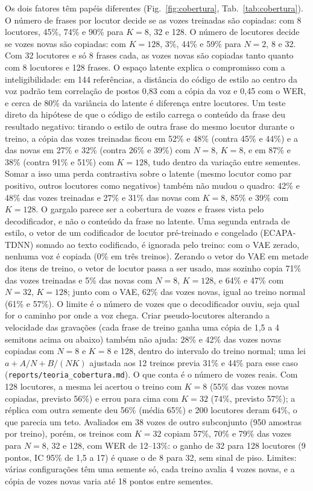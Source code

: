 \documentclass[twocolumn,a4paper,10pt]{article}
\begin{document}
Os dois fatores têm papéis diferentes (Fig.~\ref{fig:cobertura}, Tab.~\ref{tab:cobertura}). O número de frases por locutor decide se as vozes treinadas são copiadas: com 8 locutores, 45\%, 74\% e 90\% para $K=8$, 32 e 128. O número de locutores decide se vozes novas são copiadas: com $K=128$, 3\%, 44\% e 59\% para $N=2$, 8 e 32. Com 32 locutores e só 8 frases cada, as vozes novas são copiadas tanto quanto com 8 locutores e 128 frases. O espaço latente explica o compromisso com a inteligibilidade: em 144 referências, a distância do código de estilo ao centro da voz padrão tem correlação de postos 0,83 com a cópia da voz e 0,45 com o WER, e cerca de 80\% da variância do latente é diferença entre locutores. Um teste direto da hipótese de que o código de estilo carrega o conteúdo da frase deu resultado negativo: tirando o estilo de outra frase do mesmo locutor durante o treino, a cópia das vozes treinadas ficou em 52\% e 48\% (contra 45\% e 44\%) e a das novas em 27\% e 32\% (contra 26\% e 39\%) com $N=8$, $K=8$, e em 87\% e 38\% (contra 91\% e 51\%) com $K=128$, tudo dentro da variação entre sementes. Somar a isso uma perda contrastiva sobre o latente (mesmo locutor como par positivo, outros locutores como negativos) também não mudou o quadro: 42\% e 48\% das vozes treinadas e 27\% e 31\% das novas com $K=8$, 85\% e 39\% com $K=128$. O gargalo parece ser a cobertura de vozes e frases vista pelo decodificador, e não o conteúdo da frase no latente. Uma segunda entrada de estilo, o vetor de um codificador de locutor pré-treinado e congelado (ECAPA-TDNN) somado ao texto codificado, é ignorada pelo treino: com o VAE zerado, nenhuma voz é copiada (0\% em três treinos). Zerando o vetor do VAE em metade dos itens de treino, o vetor de locutor passa a ser usado, mas sozinho copia 71\% das vozes treinadas e 5\% das novas com $N=8$, $K=128$, e 64\% e 47\% com $N=32$, $K=128$; junto com o VAE, 62\% das vozes novas, igual ao treino normal (61\% e 57\%). O limite é o número de vozes que o decodificador ouviu, seja qual for o caminho por onde a voz chega. Criar pseudo-locutores alterando a velocidade das gravações (cada frase de treino ganha uma cópia de 1,5 a 4 semitons acima ou abaixo) também não ajuda: 28\% e 42\% das vozes novas copiadas com $N=8$ e $K=8$ e 128, dentro do intervalo do treino normal; uma lei $a + A/N + B/(NK)$ ajustada aos 12 treinos previa 31\% e 44\% para esse caso (\texttt{reports/teoria\_cobertura.md}). O que conta é o número de vozes reais. Com 128 locutores, a mesma lei acertou o treino com $K=8$ (55\% das vozes novas copiadas, previsto 56\%) e errou para cima com $K=32$ (74\%, previsto 57\%); a réplica com outra semente deu 56\% (média 65\%) e 200 locutores deram 64\%, o que parecia um teto. Avaliados em 38 vozes de outro subconjunto (950 amostras por treino), porém, os treinos com $K=32$ copiam 57\%, 70\% e 79\% das vozes para $N=8$, 32 e 128, com WER de 12--13\%: o ganho de 32 para 128 locutores (9 pontos, IC 95\% de 1,5 a 17) é quase o de 8 para 32, sem sinal de piso. Limites: várias configurações têm uma semente só, cada treino avalia 4 vozes novas, e a cópia de vozes novas varia até 18 pontos entre sementes.
\end{document}

